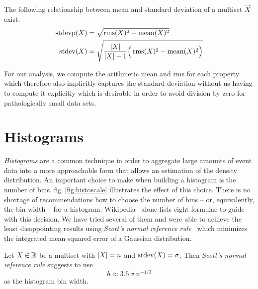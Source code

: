 \documentclass{graphstudy}
\begin{document}
The following relationship between mean and standard deviation of a multiset \(\Vec{X}\) exist.
\begin{align}
  \label{eq:mean-rms-stdev}
  \operatorname{stdevp}(\relax{X}) &= \sqrt{\operatorname{rms}(\relax{X})^2 - \operatorname{mean}(\relax{X})^2}\\[\parskip]
  \operatorname{stdev}(\relax{X})  &= \sqrt{\frac{\left\lvert\relax{X}\right\rvert}{\left\lvert\relax{X}\right\rvert-1}\Big(\operatorname{rms}(\relax{X})^2 - \operatorname{mean}(\relax{X})^2\Big)}
\end{align}

For our analysis, we compute the arithmetic mean and \ac{rms} for each property which therefore also implicitly captures
the standard deviation without us having to compute it explicitly which is desirable in order to avoid division by zero
for pathologically small data sets.

\section{Histograms}
\label{sec:boxed}

\emph{Histograms} are a common technique in order to aggregate large amounts of event data into a more approachable form
that allows an estimation of the density distribution.  An important choice to make when building a histogram is the
number of bins.  \Acl{fig}~\ref{fig:histoscale} illustrates the effect of this choice.  There is no shortage of
recommendations how to choose the number of bins -- or, equivalently, the bin width -- for a histogram.
Wikipedia~\cite{WikiHistogram} alone lists eight formulae to guide with this decision.  We have tried several of them
and were able to achieve the least disappointing results using \emph{Scott's normal reference rule}~\cite{Scott1979}
which minimizes the integrated mean squared error of a Gaussian distribution.

\begin{definition}
  Let \(\Vec{X}\in\Reals\) be a multiset with \(\left\lvert\relax{X}\right\rvert=n\) and \(\operatorname{stdev}(\relax{X})=\sigma\).  Then \emph{Scott's
    normal reference rule} suggests to use
  \begin{equation}
    \label{eq:scott-norm-ref}
    h \approx 3.5\:\sigma\:n^{-1/3}
  \end{equation}
  as the histogram bin width.
\end{definition}
\end{document}
